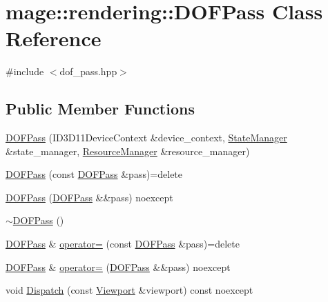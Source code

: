 \hypertarget{classmage_1_1rendering_1_1_d_o_f_pass}{}\section{mage\+:\+:rendering\+:\+:D\+O\+F\+Pass Class Reference}
\label{classmage_1_1rendering_1_1_d_o_f_pass}


{\ttfamily \#include $<$dof\+\_\+pass.\+hpp$>$}

\subsection*{Public Member Functions}
\begin{DoxyCompactItemize}
\item 
\hyperlink{classmage_1_1rendering_1_1_d_o_f_pass_a5dcf32906eadc564a8ee6331bdee5def}{D\+O\+F\+Pass} (I\+D3\+D11\+Device\+Context \&device\+\_\+context, \hyperlink{classmage_1_1rendering_1_1_state_manager}{State\+Manager} \&state\+\_\+manager, \hyperlink{classmage_1_1rendering_1_1_resource_manager}{Resource\+Manager} \&resource\+\_\+manager)
\item 
\hyperlink{classmage_1_1rendering_1_1_d_o_f_pass_a74e732ae80162b1b041a1095d38eda67}{D\+O\+F\+Pass} (const \hyperlink{classmage_1_1rendering_1_1_d_o_f_pass}{D\+O\+F\+Pass} \&pass)=delete
\item 
\hyperlink{classmage_1_1rendering_1_1_d_o_f_pass_ab77789a6762c38e7e4ac389637652963}{D\+O\+F\+Pass} (\hyperlink{classmage_1_1rendering_1_1_d_o_f_pass}{D\+O\+F\+Pass} \&\&pass) noexcept
\item 
\hyperlink{classmage_1_1rendering_1_1_d_o_f_pass_a3009125880a1546657d2f57179299e3b}{$\sim$\+D\+O\+F\+Pass} ()
\item 
\hyperlink{classmage_1_1rendering_1_1_d_o_f_pass}{D\+O\+F\+Pass} \& \hyperlink{classmage_1_1rendering_1_1_d_o_f_pass_ac70bc446c50db4ab919220a344be8045}{operator=} (const \hyperlink{classmage_1_1rendering_1_1_d_o_f_pass}{D\+O\+F\+Pass} \&pass)=delete
\item 
\hyperlink{classmage_1_1rendering_1_1_d_o_f_pass}{D\+O\+F\+Pass} \& \hyperlink{classmage_1_1rendering_1_1_d_o_f_pass_a4155c31b1fe485edf5c7c3b635b737d0}{operator=} (\hyperlink{classmage_1_1rendering_1_1_d_o_f_pass}{D\+O\+F\+Pass} \&\&pass) noexcept
\item 
void \hyperlink{classmage_1_1rendering_1_1_d_o_f_pass_aa4ee470748a5a37b62d154beec97c4f7}{Dispatch} (const \hyperlink{classmage_1_1rendering_1_1_viewport}{Viewport} \&viewport) const noexcept
\end{DoxyCompactItemize}
